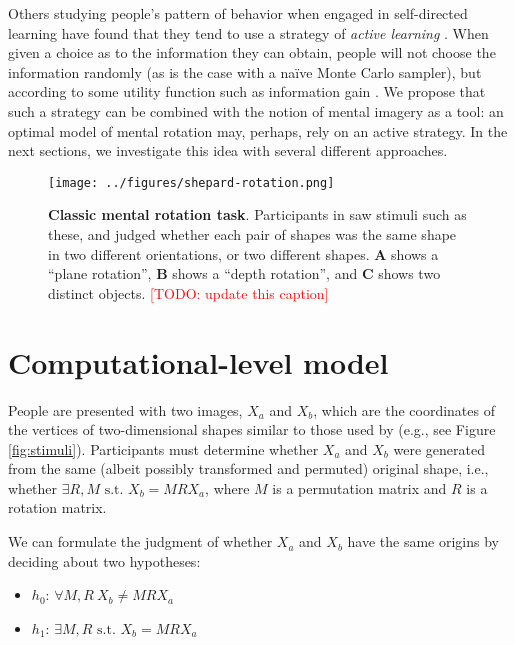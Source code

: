 \documentclass{article} %
\newcommand{\TODO}[1]{\textcolor{red}{[TODO: #1]}}
\newcommand{\naive}[0]{na\"ive}
\begin{document}
Others studying people's pattern of behavior when engaged in
self-directed learning have found that they tend to use a strategy of
\textit{active learning} \cite{Gureckis:2012gu, Markant:2012uu}. When
given a choice as to the information they can obtain, people will not
choose the information randomly (as is the case with a \naive{} Monte
Carlo sampler), but according to some utility function such as
information gain \cite{Nelson2007, Markant:2012uu}. We propose that
such a strategy can be combined with the notion of mental imagery as a
tool: an optimal model of mental rotation may, perhaps, rely on an
active strategy. In the next sections, we investigate this idea with
several different approaches.

\begin{figure}[t]
  \centering
  \texttt{[image: ../figures/shepard-rotation.png]}
  \caption{\textbf{Classic mental rotation task}. Participants in
    \cite{Shepard1971} saw stimuli such as these, and judged whether
    each pair of shapes was the same shape in two different
    orientations, or two different shapes. \textbf{A} shows a ``plane
    rotation'', \textbf{B} shows a ``depth rotation'', and \textbf{C}
    shows two distinct objects. \TODO{update this caption}}
  \label{fig:mental-rotation}
\end{figure}

\section{Computational-level model}

People are presented with two images, $X_a$ and $X_b$, which are the
coordinates of the vertices of two-dimensional shapes similar to those
used by \cite{Cooper:1975wp} (e.g., see Figure
\ref{fig:stimuli}). Participants must determine whether $X_a$ and
$X_b$ were generated from the same (albeit possibly transformed and
permuted) original shape, i.e., whether $\exists R,M\textrm{ s.t. }
X_b=MRX_a$, where $M$ is a permutation matrix and $R$ is a rotation
matrix.

We can formulate the judgment of whether $X_a$ and $X_b$ have the same
origins by deciding about two hypotheses:

\begin{itemize}
\itemsep1pt\parskip0pt
\item
  $h_0$: $\forall M,R\ X_b\neq MRX_a$
\item
  $h_1$: $\exists M,R\textrm{ s.t. } X_b=MRX_a$
\end{itemize}
\end{document}
